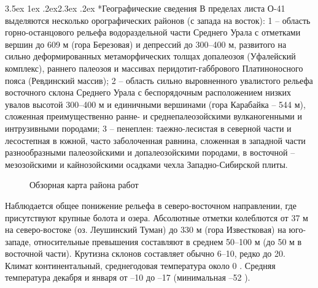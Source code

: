 \documentclass[a4paper,12pt]{article} %
\makeatletter
\renewcommand\subsection{\@startsection {subsection}{1}{\parindent}%
	{3.5ex \@plus 1ex \@minus .2ex}{2.3ex \@plus.2ex}%
	{\normalfont\hyphenpenalty=10000\large\bfseries}}
\makeatother
\begin{document}
\subsection*{Географические сведения}
В пределах листа О-41 выделяются несколько орографических районов (с запада на восток): 1 – область горно-останцового рельефа водораздельной части Среднего Урала с отметками вершин до 609 м (гора Березовая) и депрессий до 300–400 м, развитого на сильно деформированных метаморфических толщах допалеозоя (Уфалейский комплекс), раннего палеозоя и массивах перидотит-габбрового Платиноносного пояса (Ревдинский массив); 2 – область сильно выровненного увалистого рельефа восточного склона Среднего Урала с беспорядочным расположением низких
увалов высотой 300–400 м и единичными вершинами (гора Карабайка – 544 м), сложенная преимущественно ранне- и среднепалеозойскими вулканогенными и интрузивными породами; 3 – пенеплен: таежно-лесистая в северной части и лесостепная в южной, часто заболоченная равнина, сложенная в западной части разнообразными палеозойскими и допалеозойскими породами, в восточной – мезозойскими и кайнозойскими осадками чехла Западно-Сибирской плиты. 
\begin{figure}[h]
	\caption{Обзорная карта района работ}
\end{figure}
Наблюдается общее понижение рельефа в северо-восточном направлении, где присутствуют крупные болота и озера. Абсолютные отметки колеблются от 37 м на северо-востоке (оз. Леушинский Туман) до 330 м (гора Известковая) на юго-западе, относительные превышения составляют в среднем 50–100 м (до 50 м в восточной части). Крутизна склонов составляет обычно 6–10\degree, редко до 20\degree.
Климат континентальный, среднегодовая температура около 0 . Средняя температура декабря и января от –10 до –17  (минимальная –52 ).
\end{document}
